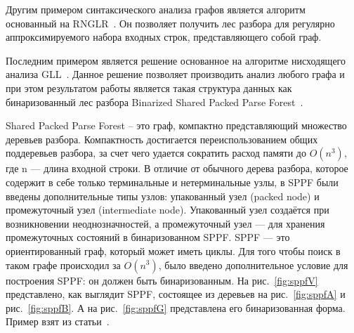 Другим примером синтаксического анализа графов является алгоритм основанный на RNGLR~\cite{RNGLR}. Он позволяет получить лес разбора для регулярно аппроксимируемого набора входных строк, представляющего собой граф.

 Последним примером является решение основанное на алгоритме нисходящего анализа GLL~\cite{GrigRagCFPQuerying}. Данное решение позволяет производить анализ любого графа и при этом результатом работы является такая структура данных как бинаризованный лес разбора Binarized Shared Packed Parse Forest~\cite{SPPF}. 

 Shared Packed Parse Forest – это граф, компактно представляющий множество деревьев разбора. Компактность достигается переиспользованием общих поддеревьев разбора, за счет чего удается сократить расход памяти до $O(n^3)$, где n — длина входной строки. В отличие от обычного дерева разбора, которое содержит в себе только терминальные и нетерминальные узлы, в SPPF были введены дополнительные типы узлов: упакованный узел (packed node) и промежуточный узел (intermediate node). Упакованный узел создаётся при возникновении неоднозначностей, а промежуточный узел — для хранения промежуточных состояний в бинаризованном SPPF. SPPF — это ориентированный граф, который может иметь циклы. Для того чтобы поиск в таком графе происходил за $O(n^3)$, было введено дополнительное условие для построения SPPF: он должен быть бинаризованным. На рис.~\ref{fig:sppfV} представлено, как выглядит SPPF, состоящее из деревьев на рис.~\ref{fig:sppfA} и рис.~\ref{fig:sppfB}. А на рис.~\ref{fig:sppfG} представлена его бинаризованная форма. Пример взят из статьи~\cite{IzmCombinator}.

